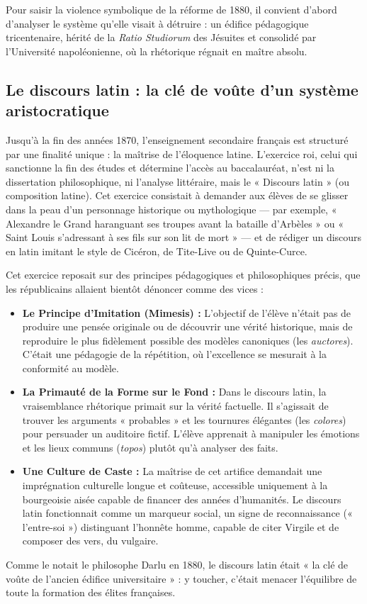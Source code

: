 Pour saisir la violence symbolique de la réforme de 1880, il convient d'abord d'analyser le système
qu'elle visait à détruire : un édifice pédagogique tricentenaire, hérité de la \textit{Ratio
Studiorum} des Jésuites et consolidé par l'Université napoléonienne, où la rhétorique régnait en
maître absolu.



\subsection{Le discours latin : la clé de voûte d'un système aristocratique}

Jusqu'à la fin des années 1870, l'enseignement secondaire français est structuré par une finalité
unique : la maîtrise de l'éloquence latine. L'exercice roi, celui qui sanctionne la fin des études
et détermine l'accès au baccalauréat, n'est ni la dissertation philosophique, ni l'analyse
littéraire, mais le « Discours latin » (ou composition latine). Cet exercice consistait à demander
aux élèves de se glisser dans la peau d'un personnage historique ou mythologique — par exemple, «
Alexandre le Grand haranguant ses troupes avant la bataille d'Arbèles » ou « Saint Louis s'adressant
à ses fils sur son lit de mort » — et de rédiger un discours en latin imitant le style de Cicéron,
de Tite-Live ou de Quinte-Curce.\cite{I-1-2-ref2}

Cet exercice reposait sur des principes pédagogiques et philosophiques précis, que les républicains
allaient bientôt dénoncer comme des vices :

\begin{itemize}\item \textbf{Le Principe d'Imitation (Mimesis) :} L'objectif de l'élève n'était pas de produire une pensée originale ou de découvrir une vérité historique, mais de reproduire le plus fidèlement possible des modèles canoniques (les \textit{auctores}). C'était une pédagogie de la répétition, où l'excellence se mesurait à la conformité au modèle.\cite{I-1-2-ref2}\item \textbf{La Primauté de la Forme sur le Fond :} Dans le discours latin, la vraisemblance rhétorique primait sur la vérité factuelle. Il s'agissait de trouver les arguments « probables » et les tournures élégantes (les \textit{colores}) pour persuader un auditoire fictif. L'élève apprenait à manipuler les émotions et les lieux communs (\textit{topos}) plutôt qu'à analyser des faits.\cite{I-1-2-ref5}\item \textbf{Une Culture de Caste :} La maîtrise de cet artifice demandait une imprégnation culturelle longue et coûteuse, accessible uniquement à la bourgeoisie aisée capable de financer des années d'humanités. Le discours latin fonctionnait comme un marqueur social, un signe de reconnaissance (« l'entre-soi ») distinguant l'honnête homme, capable de citer Virgile et de composer des vers, du vulgaire.\cite{I-1-2-ref8}\end{itemize}Comme le notait le philosophe Darlu en 1880, le discours latin était « la clé de voûte de l'ancien
édifice universitaire » : y toucher, c'était menacer l'équilibre de toute la formation des élites
françaises.\cite{I-1-2-ref7}



